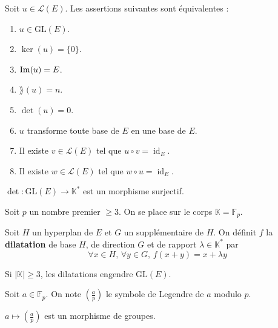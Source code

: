 
  \begin{theorem}
    Soit $u \in \mathcal{L}(E)$. Les assertions suivantes sont équivalentes :
    \begin{enumerate}[label=(\roman*)]
      \item $u \in \mathrm{GL}(E)$.
      \item $\ker(u) = \{ 0 \}$.
      \item $\mathrm{Im}(u) = E$.
      \item $\rang(u) = n$.
      \item $\det(u) = 0$.
      \item $u$ transforme toute base de $E$ en une base de $E$.
      \item Il existe $v \in \mathcal{L}(E)$ tel que $u \circ v = \operatorname{id}_E$.
      \item Il existe $w \in \mathcal{L}(E)$ tel que $w \circ u = \operatorname{id}_E$.
    \end{enumerate}
  \end{theorem}


  \begin{proposition}
    $\det : \mathrm{GL}(E) \rightarrow \mathbb{K}^*$ est un morphisme surjectif.
  \end{proposition}


  Soit $p$ un nombre premier $\geq 3$. On se place sur le corps $\mathbb{K} = \mathbb{F}_p$.

  \begin{definition}
    Soit $H$ un hyperplan de $E$ et $G$ un supplémentaire de $H$. On définit $f$ la \textbf{dilatation} de base $H$, de direction $G$ et de rapport $\lambda \in \mathbb{K}^*$ par
    \[ \forall x \in H, \, \forall y \in G, \, f(x+y) = x + \lambda y \]
  \end{definition}

  \begin{theorem}
    Si $|\mathbb{K}| \geq 3$, les dilatations engendre $\mathrm{GL}(E)$.
  \end{theorem}

  \begin{notation}
    Soit $a \in \mathbb{F}_p$. On note $\left( \frac{a}{p} \right)$ le symbole de Legendre de $a$ modulo $p$.
  \end{notation}

  \begin{lemma}
    $a \mapsto \left( \frac{a}{p} \right)$ est un morphisme de groupes.
  \end{lemma}

